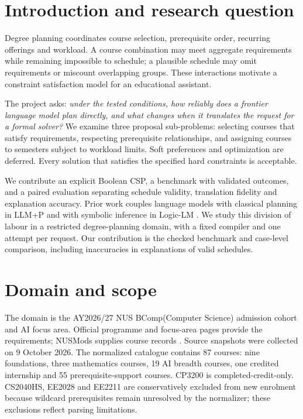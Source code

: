 \documentclass[11pt,a4paper]{article}
\begin{document}
\section{Introduction and research question}
Degree planning coordinates course selection, prerequisite order, recurring
offerings and workload. A course combination may meet aggregate requirements
while remaining impossible to schedule; a plausible schedule may omit
requirements or miscount overlapping groups. These interactions motivate a
constraint satisfaction model for an educational assistant.

The project asks: \emph{under the tested conditions, how reliably does a frontier
language model plan directly, and what changes when it translates the request
for a formal solver?} We examine three proposal sub-problems: selecting courses
that satisfy requirements, respecting prerequisite relationships, and assigning
courses to semesters subject to workload limits. Soft preferences and
optimization are deferred. Every solution that satisfies the specified hard
constraints is acceptable.

We contribute an explicit Boolean CSP, a benchmark with validated outcomes,
and a paired evaluation separating schedule validity, translation fidelity
and explanation accuracy. Prior work couples language models with classical
planning in LLM+P \cite{llmp} and with symbolic inference in Logic-LM
\cite{logiclm}. We study this division of labour in a restricted degree-planning
domain, with a fixed compiler and one attempt per request. Our contribution
is the checked benchmark and case-level comparison, including inaccuracies
in explanations of valid schedules.

\section{Domain and scope}
The domain is the AY2026/27 NUS BComp(Computer Science) admission cohort and AI
focus area. Official programme and focus-area pages provide the requirements;
NUSMods supplies course records \cite{nuscohort,nusfocus,nusmods}. Source
snapshots were collected on 9 October 2026. The normalized catalogue contains
87 courses: nine foundations, three mathematics courses, 19 AI breadth
courses, one credited internship and 55 prerequisite-support courses.
CP3200 is completed-credit-only. CS2040HS, EE2028 and EE2211 are conservatively
excluded from new enrolment because wildcard prerequisites remain unresolved
by the normalizer; these exclusions reflect parsing limitations.
\end{document}
